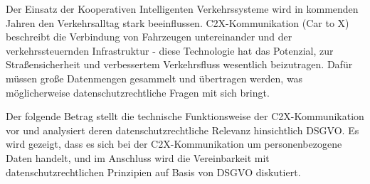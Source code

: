 

Der Einsatz der Kooperativen Intelligenten Verkehrssysteme wird in kommenden Jahren den Verkehrsalltag stark beeinflussen. C2X-Kommunikation (Car to X) beschreibt die Verbindung von Fahrzeugen untereinander und der verkehrssteuernden Infrastruktur - diese Technologie hat das Potenzial, zur Straßensicherheit und verbessertem Verkehrsfluss wesentlich beizutragen. Dafür müssen große Datenmengen gesammelt und übertragen werden, was möglicherweise datenschutzrechtliche Fragen mit sich bringt.

Der folgende Betrag stellt die technische Funktionsweise der C2X-Kommunikation vor und analysiert deren datenschutzrechtliche Relevanz hinsichtlich DSGVO. Es wird gezeigt, dass es sich bei der C2X-Kommunikation um personenbezogene Daten handelt, und im Anschluss wird die Vereinbarkeit mit datenschutzrechtlichen Prinzipien auf Basis von DSGVO diskutiert.